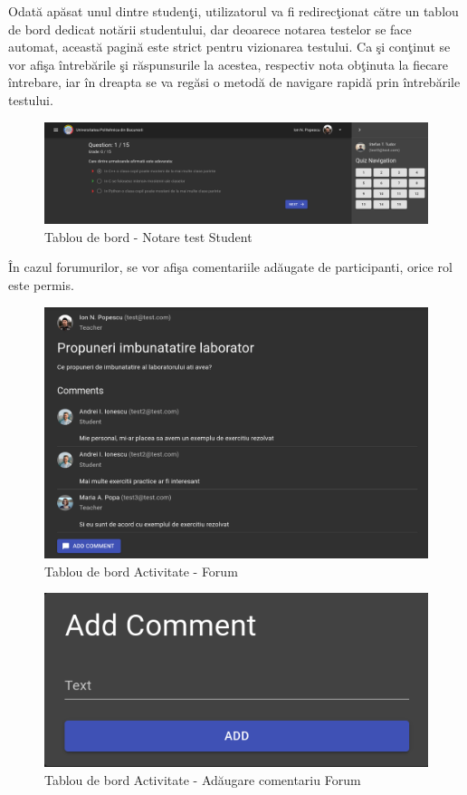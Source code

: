 \documentclass[12pt, a4paper, oneside, romanian]{teza-upb}
\begin{document}
Odată apăsat unul dintre studenţi, utilizatorul va fi redirecţionat către un tablou de bord dedicat notării studentului, dar deoarece notarea testelor se face automat, această pagină este strict pentru vizionarea testului. Ca şi conţinut se vor afişa întrebările şi răspunsurile la acestea, respectiv nota obţinuta la fiecare întrebare, iar în dreapta se va regăsi o metodă de navigare rapidă prin întrebările testului.

\begin{figure}[H]
\centering
\includegraphics*[width=\columnwidth]{tablou-de-bord-notare-test-student}
\caption{Tablou de bord - Notare test Student}
\label{tablou-de-bord-notare-test-student}
\end{figure}

În cazul forumurilor, se vor afişa comentariile adăugate de participanti, orice rol este permis.

\begin{figure}[H]
\centering
\includegraphics*[width=\columnwidth]{tablou-de-bord-forum}
\caption{Tablou de bord Activitate - Forum}
\label{tablou-de-bord-forum}
\end{figure}

\begin{figure}[H]
\centering
\includegraphics*[width=0.5\columnwidth]{tablou-de-bord-activitate-adaugare-comentariu-forum}
\caption{Tablou de bord Activitate - Adăugare comentariu Forum}
\label{tablou-de-bord-activitate-adaugare-comentariu-forum}
\end{figure}
\end{document}
